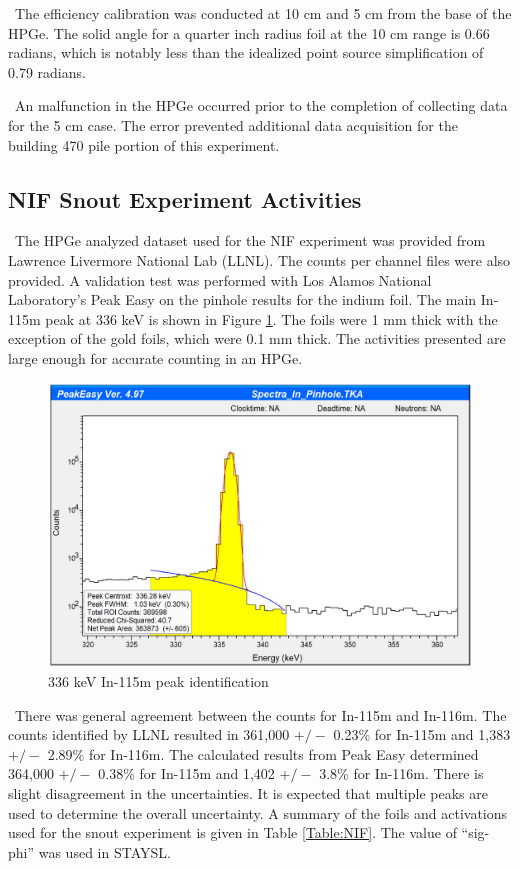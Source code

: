 \documentclass[journal]{IEEEtran}
\let\MYoriglatexcaption\caption
\renewcommand{\caption}[2][\relax]{\MYoriglatexcaption[#2]{#2}}
\begin{document}
	\ The efficiency calibration was conducted at 10 cm and 5 cm from the base of the HPGe. The solid angle for a quarter inch radius foil at the 10 cm range is 0.66 radians, which is notably less than the idealized point source simplification of 0.79 radians. 
	
	\ An malfunction in the HPGe occurred prior to the completion of collecting data for the 5 cm case. The error prevented additional data acquisition for the building 470 pile portion of this experiment.
	
	\subsection{NIF Snout Experiment Activities}
	  
	\ The HPGe analyzed dataset used for the NIF experiment was provided from Lawrence Livermore National Lab (LLNL). The counts per channel files were also provided. A validation test was performed with Los Alamos National Laboratory's Peak Easy on the pinhole results for the indium foil. The main In-115m peak at 336 keV is shown in Figure \ref{fig:peakez}. The foils were 1 mm thick with the exception of the gold foils, which were 0.1 mm thick. The activities presented are large enough for accurate counting in an HPGe. 
	
	\begin{figure}[h]
		\includegraphics[width=\linewidth]{Figures/PeakEZ.png}
		\caption{336 keV In-115m peak identification}
		\label{fig:peakez}
	\end{figure}

	\ There was general agreement between the counts for In-115m and In-116m. The counts identified by LLNL resulted in 361,000 $+/-$ 0.23\% for In-115m and 1,383 $+/-$ 2.89\% for In-116m. The calculated results from Peak Easy determined 364,000 $+/-$ 0.38\% for In-115m and 1,402 $+/-$ 3.8\% for In-116m. There is slight disagreement in the uncertainties. It is expected that multiple peaks are used to determine the overall uncertainty. A summary of the foils and activations used for the snout experiment is given in Table \ref{Table:NIF}. The value of ``sig-phi'' was used in STAYSL.
	
\end{document}
